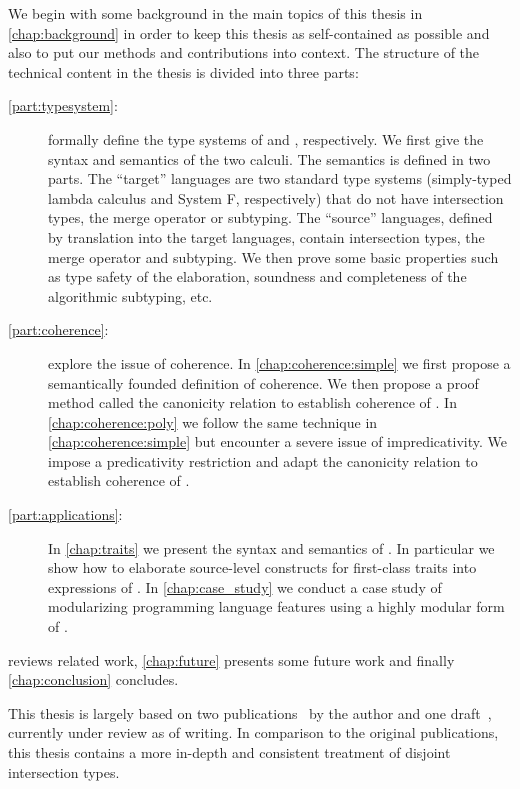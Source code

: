 We begin with some background in the main topics of this thesis in
\cref{chap:background} in order to keep this thesis as self-contained as
possible and also to put our methods and contributions into context. The
structure of the technical content in the thesis is divided into three parts:
\begin{description}
\item[\cref{part:typesystem}:]  formally define the type systems of
  \namee and \fnamee, respectively. We first give the syntax and semantics of
  the two calculi. The semantics is defined in two parts. The ``target''
  languages are two standard type systems (simply-typed lambda calculus and
  System F, respectively) that do not have intersection types, the merge
  operator or subtyping. The ``source'' languages, defined by translation into
  the target languages, contain intersection types, the merge operator and
  subtyping. We then prove some basic properties such as type safety of
  the elaboration, soundness and completeness of the algorithmic subtyping, etc.
\item[\cref{part:coherence}:]  explore the
  issue of coherence. In \cref{chap:coherence:simple} we first propose a
  semantically founded definition of coherence. We then propose a proof method
  called the canonicity relation to establish coherence of \namee. In
  \cref{chap:coherence:poly} we follow the same technique in
  \cref{chap:coherence:simple} but encounter a severe issue of impredicativity.
  We impose a predicativity restriction and adapt the canonicity relation to
  establish coherence of \fnamee.
\item[\cref{part:applications}:] In \cref{chap:traits} we present the syntax and semantics of
  \sedel. In particular we show how to elaborate source-level constructs for
  first-class traits into expressions of \fnamee. In \cref{chap:case_study} we
  conduct a case study of modularizing programming language features using a
  highly modular form of \visitor.
\end{description}
 reviews related work, \cref{chap:future} presents some future
work and finally \cref{chap:conclusion} concludes.

This thesis is largely based on two
publications~\citep{bi_et_al:LIPIcs:2018:9214, bi_et_al:LIPIcs:2018:9227} by the
author and one draft~\citep{xuanbiesop}, currently under review as of writing.
In comparison to the original publications, this thesis contains a more in-depth
and consistent treatment of disjoint intersection types.

